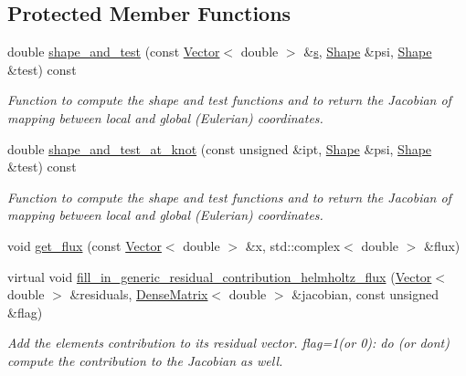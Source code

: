 \subsection*{Protected Member Functions}
\begin{DoxyCompactItemize}
\item 
double \hyperlink{classoomph_1_1PMLHelmholtzFluxElement_a36a98a04cd015bc86ba3c7a7680b1dd3}{shape\+\_\+and\+\_\+test} (const \hyperlink{classoomph_1_1Vector}{Vector}$<$ double $>$ \&\hyperlink{cfortran_8h_ab7123126e4885ef647dd9c6e3807a21c}{s}, \hyperlink{classoomph_1_1Shape}{Shape} \&psi, \hyperlink{classoomph_1_1Shape}{Shape} \&test) const
\begin{DoxyCompactList}\small\item\em Function to compute the shape and test functions and to return the Jacobian of mapping between local and global (Eulerian) coordinates. \end{DoxyCompactList}\item 
double \hyperlink{classoomph_1_1PMLHelmholtzFluxElement_acf1a94a1f41fcf43f5904ae1eab9306c}{shape\+\_\+and\+\_\+test\+\_\+at\+\_\+knot} (const unsigned \&ipt, \hyperlink{classoomph_1_1Shape}{Shape} \&psi, \hyperlink{classoomph_1_1Shape}{Shape} \&test) const
\begin{DoxyCompactList}\small\item\em Function to compute the shape and test functions and to return the Jacobian of mapping between local and global (Eulerian) coordinates. \end{DoxyCompactList}\item 
void \hyperlink{classoomph_1_1PMLHelmholtzFluxElement_abce15d81e9ea944834ee230fe79aa217}{get\+\_\+flux} (const \hyperlink{classoomph_1_1Vector}{Vector}$<$ double $>$ \&x, std\+::complex$<$ double $>$ \&flux)
\item 
virtual void \hyperlink{classoomph_1_1PMLHelmholtzFluxElement_ac12f0ede6a5fab9d441105ad4e856d01}{fill\+\_\+in\+\_\+generic\+\_\+residual\+\_\+contribution\+\_\+helmholtz\+\_\+flux} (\hyperlink{classoomph_1_1Vector}{Vector}$<$ double $>$ \&residuals, \hyperlink{classoomph_1_1DenseMatrix}{Dense\+Matrix}$<$ double $>$ \&jacobian, const unsigned \&flag)
\begin{DoxyCompactList}\small\item\em Add the element\textquotesingle{}s contribution to its residual vector. flag=1(or 0)\+: do (or don\textquotesingle{}t) compute the contribution to the Jacobian as well. \end{DoxyCompactList}\end{DoxyCompactItemize}
